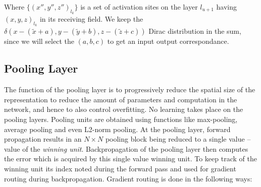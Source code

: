 \documentclass[final, paper=letter,5p,times,twocolumn]{elsarticle}
\begin{document}




Where $\{(x'',y'',z'')_{l_{k}}\}$ is a set of activation sites on the layer $l_{u+1}$ having $(x,y,z)_{l_{k}}$ in its receiving field. We keep the $\delta(x-(\tilde{x}+a),y-(\tilde{y}+b),z-(\tilde{z}+c))$ Dirac distribution in the sum, since we will select the $(a,b,c)$ to get an input output correspondance. 

\subsection{Pooling Layer}

The function of the pooling layer is to progressively reduce the spatial size of the representation to reduce the amount of parameters and computation in the network, and hence to also control overfitting. No learning takes place on the pooling layers. Pooling units are obtained using functions like max-pooling, average pooling and even L2-norm pooling. At the pooling layer, forward propagation results in an $N \times N$ pooling block being reduced to a single value -- value of the {\it winning unit}. Backpropagation of the pooling layer then computes the error which is acquired by this single value winning unit. To keep track of the winning unit its index noted during the forward pass and used for gradient routing during backpropagation. Gradient routing is done in the following ways:
\end{document}
